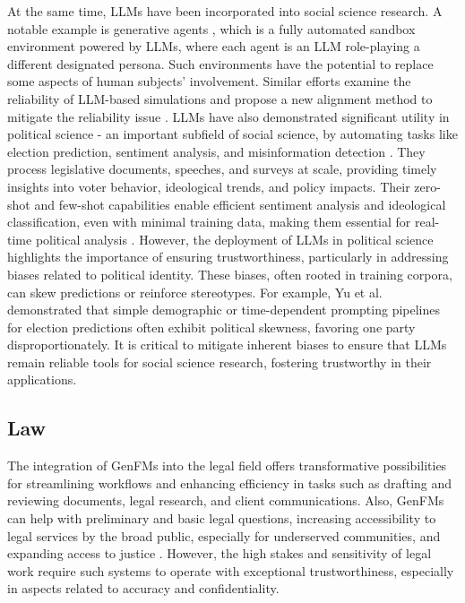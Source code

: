 At the same time, LLMs have been incorporated into social science research. A notable example is generative agents \cite{park2023generative}, which is a fully automated sandbox environment powered by LLMs, where each agent is an LLM role-playing a different designated persona. Such environments have the potential to replace some aspects of human subjects’ involvement. Similar efforts examine the reliability of LLM-based simulations and propose a new alignment method to mitigate the reliability issue \cite{huang2024social}. LLMs have also demonstrated significant utility in political science - an important subfield of social science, by automating tasks like election prediction, sentiment analysis, and misinformation detection \cite{li2024political}. They process legislative documents, speeches, and surveys at scale, providing timely insights into voter behavior, ideological trends, and policy impacts. Their zero-shot and few-shot capabilities enable efficient sentiment analysis and ideological classification, even with minimal training data, making them essential for real-time political analysis \cite{kuila2024deciphering, ibrahim2024analyzing}. However, the deployment of LLMs in political science highlights the importance of ensuring trustworthiness, particularly in addressing biases related to political identity. These biases, often rooted in training corpora, can skew predictions or reinforce stereotypes. For example, Yu et al. \cite{yu2024largeelection} demonstrated that simple demographic or time-dependent prompting pipelines for election predictions often exhibit political skewness, favoring one party disproportionately. It is critical to mitigate inherent biases to ensure that LLMs remain reliable tools for social science research, fostering trustworthy in their applications.






\subsection{Law}
The integration of GenFMs into the legal field offers transformative possibilities for streamlining workflows and enhancing efficiency in tasks such as drafting and reviewing documents, legal research, and client communications. Also, GenFMs can help with preliminary and basic legal questions, increasing accessibility to legal services by the broad public, especially for underserved communities, and expanding access to justice \cite{simshaw2022access, marwala2024artificial, li2024legalagentbench}. However, the high stakes and sensitivity of legal work require such systems to operate with exceptional trustworthiness, especially in aspects related to accuracy and confidentiality. 

